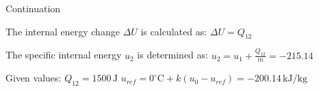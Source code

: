 Continuation

The internal energy change \( \Delta U \) is calculated as:  
\( \Delta U = Q_{12} \)  

The specific internal energy \( u_2 \) is determined as:  
\( u_2 = u_1 + \frac{Q_{12}}{m} = -215.14 \)  

Given values:  
\( Q_{12} = 1500 \, \text{J} \)  
\( u_{ref} = 0^\circ \text{C} + k (u_{0} - u_{ref}) = -200.14 \, \text{kJ/kg} \)